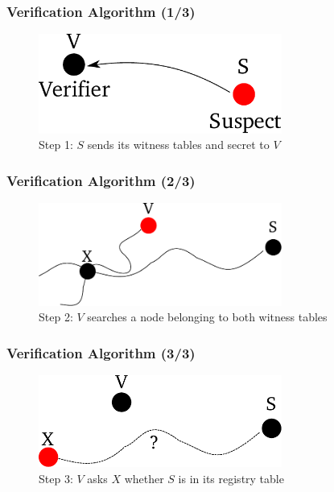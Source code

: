 \documentclass{beamer}
\begin{document}

\begin{frame}

  \frametitle{Verification Algorithm (1/3)}

  \begin{figure}
    \includegraphics[width=8cm]{./pictures/verification_1} 
    \caption{Step 1: $S$ sends its witness tables and secret to $V$}
  \end{figure}

\end{frame}


\begin{frame}

  \frametitle{Verification Algorithm (2/3)}

  \begin{figure}
    \includegraphics[width=8cm]{./pictures/verification_2} 
    \caption{Step 2: $V$ searches a node belonging to both witness tables}
  \end{figure}

\end{frame}


\begin{frame}

  \frametitle{Verification Algorithm (3/3)}

  \begin{figure}
    \includegraphics[width=8cm]{./pictures/verification_3} 
    \caption{Step 3: $V$ asks $X$ whether $S$ is in its registry table}
  \end{figure}

\end{frame}
\end{document}
